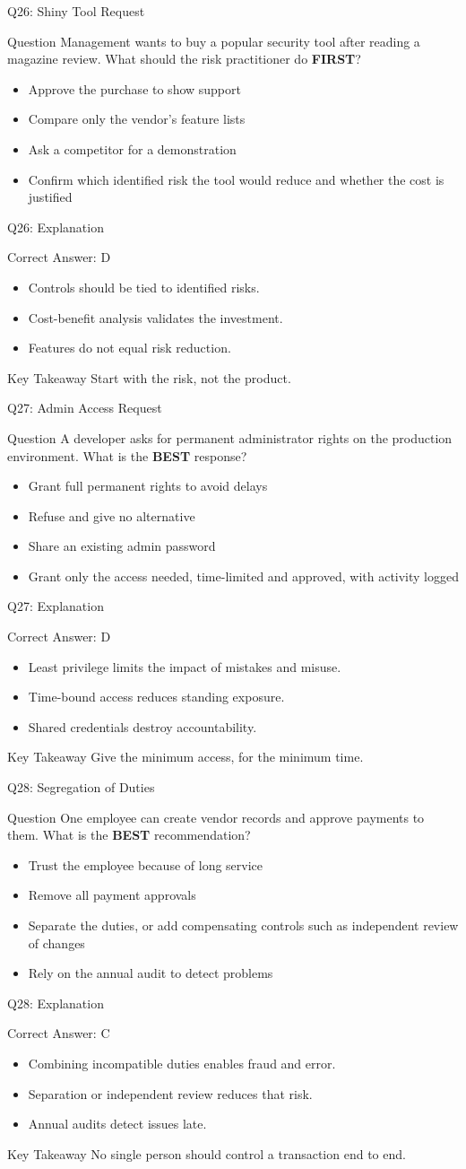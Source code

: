 \documentclass[aspectratio=169]{beamer}
\newcommand{\hq}[7]{%
	\begin{frame}{Q#1: #2}
		\begin{block}{Question}
			#3
		\end{block}
		\begin{itemize}
			#4
		\end{itemize}
	\end{frame}
	\begin{frame}{Q#1: Explanation}
		\begin{block}{Correct Answer: #5}
			\begin{itemize}
				#6
			\end{itemize}
		\end{block}
		\begin{alertblock}{Key Takeaway}
			#7
		\end{alertblock}
	\end{frame}
}
\begin{document}
	\hq{26}{Shiny Tool Request}
	{Management wants to buy a popular security tool after reading a magazine review. What should the risk practitioner do \textbf{FIRST}?}
	{\item[\textbf{(A)}] Approve the purchase to show support
		\item[\textbf{(B)}] Compare only the vendor's feature lists
		\item[\textbf{(C)}] Ask a competitor for a demonstration
		\item[\textbf{(D)}] Confirm which identified risk the tool would reduce and whether the cost is justified}
	{D}
	{\item Controls should be tied to identified risks.
		\item Cost-benefit analysis validates the investment.
		\item Features do not equal risk reduction.}
	{Start with the risk, not the product.}
	
	\hq{27}{Admin Access Request}
	{A developer asks for permanent administrator rights on the production environment. What is the \textbf{BEST} response?}
	{\item[\textbf{(A)}] Grant full permanent rights to avoid delays
		\item[\textbf{(B)}] Refuse and give no alternative
		\item[\textbf{(C)}] Share an existing admin password
		\item[\textbf{(D)}] Grant only the access needed, time-limited and approved, with activity logged}
	{D}
	{\item Least privilege limits the impact of mistakes and misuse.
		\item Time-bound access reduces standing exposure.
		\item Shared credentials destroy accountability.}
	{Give the minimum access, for the minimum time.}
	
	\hq{28}{Segregation of Duties}
	{One employee can create vendor records and approve payments to them. What is the \textbf{BEST} recommendation?}
	{\item[\textbf{(A)}] Trust the employee because of long service
		\item[\textbf{(B)}] Remove all payment approvals
		\item[\textbf{(C)}] Separate the duties, or add compensating controls such as independent review of changes
		\item[\textbf{(D)}] Rely on the annual audit to detect problems}
	{C}
	{\item Combining incompatible duties enables fraud and error.
		\item Separation or independent review reduces that risk.
		\item Annual audits detect issues late.}
	{No single person should control a transaction end to end.}
	
\end{document}
